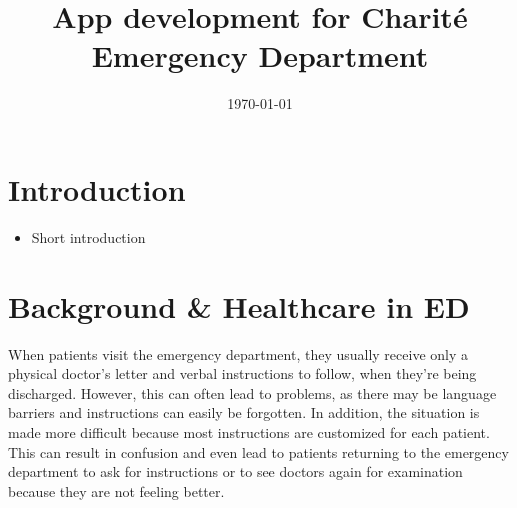 \documentclass[]{report}
\title{App development for Charité Emergency Department}
\author{}
\date{\today}
\begin{document}
\maketitle

\section{Introduction}
\begin{itemize}
    \item Short introduction
\end{itemize}

\section{Background \& Healthcare in ED}
When patients visit the emergency department, they usually receive only a physical doctor's letter and verbal instructions to follow, when they're being discharged. However, this can often lead to problems, as there may be language barriers and instructions can easily be forgotten. In addition, the situation is made more difficult because most instructions are customized for each patient. This can result in confusion and even lead to patients returning to the emergency department to ask for instructions or to see doctors again for examination because they are not feeling better.
\end{document}

